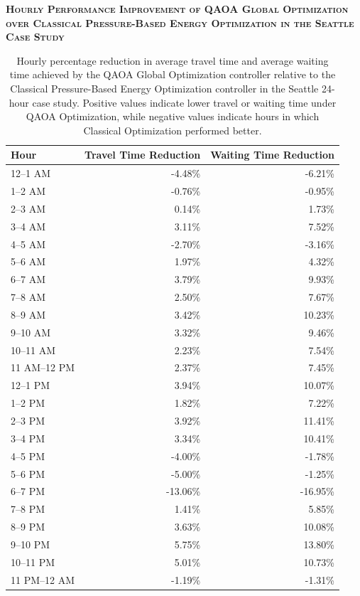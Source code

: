 \documentclass[12pt]{article}
\begin{document}
\begin{table}[H]
\centering
\textbf{\textsc{Hourly Performance Improvement of QAOA Global Optimization over Classical Pressure-Based Energy Optimization in the Seattle Case Study}}

\vspace{0.3cm}

\begin{tabular}{@{} l r r @{}}
\toprule
\textbf{Hour} & \textbf{Travel Time Reduction} & \textbf{Waiting Time Reduction} \\
\midrule
12--1 AM & -4.48\% & -6.21\% \\
1--2 AM & -0.76\% & -0.95\% \\
2--3 AM & 0.14\% & 1.73\% \\
3--4 AM & 3.11\% & 7.52\% \\
4--5 AM & -2.70\% & -3.16\% \\
5--6 AM & 1.97\% & 4.32\% \\
6--7 AM & 3.79\% & 9.93\% \\
7--8 AM & 2.50\% & 7.67\% \\
8--9 AM & 3.42\% & 10.23\% \\
9--10 AM & 3.32\% & 9.46\% \\
10--11 AM & 2.23\% & 7.54\% \\
11 AM--12 PM & 2.37\% & 7.45\% \\
12--1 PM & 3.94\% & 10.07\% \\
1--2 PM & 1.82\% & 7.22\% \\
2--3 PM & 3.92\% & 11.41\% \\
3--4 PM & 3.34\% & 10.41\% \\
4--5 PM & -4.00\% & -1.78\% \\
5--6 PM & -5.00\% & -1.25\% \\
6--7 PM & -13.06\% & -16.95\% \\
7--8 PM & 1.41\% & 5.85\% \\
8--9 PM & 3.63\% & 10.08\% \\
9--10 PM & 5.75\% & 13.80\% \\
10--11 PM & 5.01\% & 10.73\% \\
11 PM--12 AM & -1.19\% & -1.31\% \\
\bottomrule
\end{tabular}

\caption{Hourly percentage reduction in average travel time and average waiting time achieved by the QAOA Global Optimization controller relative to the Classical Pressure-Based Energy Optimization controller in the Seattle 24-hour case study. Positive values indicate lower travel or waiting time under QAOA Optimization, while negative values indicate hours in which Classical Optimization performed better.}
\label{tab:seattle-qaoa-vs-classical-hourly-percent-table}
\end{table}
\end{document}

